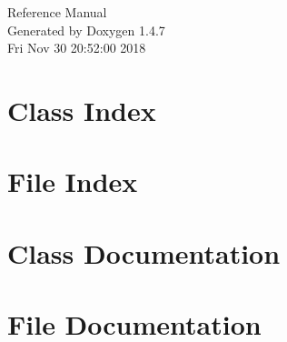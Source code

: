 \documentclass[a4paper]{book}
\begin{document}
\begin{titlepage}
\vspace*{7cm}
\begin{center}
{\Large Reference Manual}\\
\vspace*{1cm}
{\large Generated by Doxygen 1.4.7}\\
\vspace*{0.5cm}
{\small Fri Nov 30 20:52:00 2018}\\
\end{center}
\end{titlepage}
\clearemptydoublepage
{}
\tableofcontents
\clearemptydoublepage
{}
\chapter{Class Index}

\chapter{File Index}

\chapter{Class Documentation}










\chapter{File Documentation}




\printindex
\end{document}
